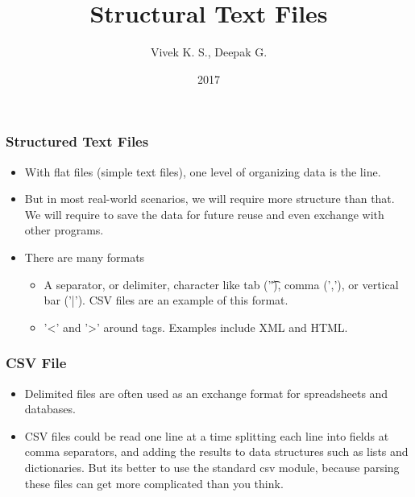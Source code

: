 \documentclass{beamer}
\title{Structural Text Files}
\author{Vivek K. S., Deepak G.}
\institute{Information Systems Decision Sciences (ISDS)\\
MUMA College of Business\\
University of South Florida \\
Tampa, Florida}
\date{2017}
\begin{document}
\frame{\titlepage}

\begin{frame}
\frametitle{Structured Text Files}
\begin{itemize}
\item With flat files (simple text files), one level of organizing data is the line.
\item But in most real-world scenarios, we will require more structure than that. We will require to save the data for future reuse and even exchange with other programs.
\item There are many formats
\begin{itemize}
\item A separator, or delimiter, character like tab ('\t'), comma (','), or vertical bar
('|'). CSV files are an example of this format.
\item '<' and '>' around tags. Examples include XML and HTML.
\end{itemize}
\end{itemize}
\end{frame}

\begin{frame}
\frametitle{CSV File}
\begin{itemize}
\item Delimited files are often used as an exchange format for spreadsheets and databases.
\item CSV files could be read one line at a time splitting each line into fields at
comma separators, and adding the results to data structures such as lists and dictionaries.
But its better to use the standard csv module, because parsing these files can get
more complicated than you think.
\end{itemize}
\end{frame}
\end{document}

